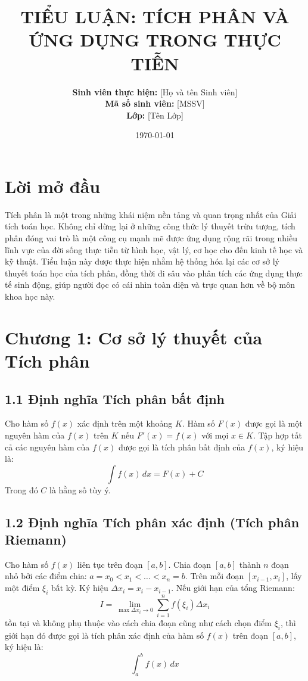 \documentclass[12pt,a4paper]{article}
\title{\textbf{TIỂU LUẬN: TÍCH PHÂN VÀ ỨNG DỤNG TRONG THỰC TIỄN}}
\author{\textbf{Sinh viên thực hiện:} [Họ và tên Sinh viên] \\ \textbf{Mã số sinh viên:} [MSSV] \\ \textbf{Lớp:} [Tên Lớp]}
\date{\today}
\begin{document}
\maketitle
\newpage

\tableofcontents
\newpage

\section*{Lời mở đầu}
Tích phân là một trong những khái niệm nền tảng và quan trọng nhất của Giải tích toán học. Không chỉ dừng lại ở những công thức lý thuyết trừu tượng, tích phân đóng vai trò là một công cụ mạnh mẽ được ứng dụng rộng rãi trong nhiều lĩnh vực của đời sống thực tiễn từ hình học, vật lý, cơ học cho đến kinh tế học và kỹ thuật. Tiểu luận này được thực hiện nhằm hệ thống hóa lại các cơ sở lý thuyết toán học của tích phân, đồng thời đi sâu vào phân tích các ứng dụng thực tế sinh động, giúp người đọc có cái nhìn toàn diện và trực quan hơn về bộ môn khoa học này.

\newpage

\section{Chương 1: Cơ sở lý thuyết của Tích phân}

\subsection{1.1 Định nghĩa Tích phân bất định}
Cho hàm số $f(x)$ xác định trên một khoảng $K$. Hàm số $F(x)$ được gọi là một nguyên hàm của $f(x)$ trên $K$ nếu $F'(x) = f(x)$ với mọi $x \in K$.
Tập hợp tất cả các nguyên hàm của $f(x)$ được gọi là tích phân bất định của $f(x)$, ký hiệu là:
\begin{equation}
\int f(x) \, dx = F(x) + C
\end{equation}
Trong đó $C$ là hằng số tùy ý.

\subsection{1.2 Định nghĩa Tích phân xác định (Tích phân Riemann)}
Cho hàm số $f(x)$ liên tục trên đoạn $[a, b]$. Chia đoạn $[a, b]$ thành $n$ đoạn nhỏ bởi các điểm chia: $a = x_0 < x_1 < \dots < x_n = b$. Trên mỗi đoạn $[x_{i-1}, x_i]$, lấy một điểm $\xi_i$ bất kỳ. Ký hiệu $\Delta x_i = x_i - x_{i-1}$. 
Nếu giới hạn của tổng Riemann:
\begin{equation}
I = \lim_{\max \Delta x_i \to 0} \sum_{i=1}^{n} f(\xi_i) \Delta x_i
\end{equation}
tồn tại và không phụ thuộc vào cách chia đoạn cũng như cách chọn điểm $\xi_i$, thì giới hạn đó được gọi là tích phân xác định của hàm số $f(x)$ trên đoạn $[a, b]$, ký hiệu là:
\begin{equation}
\int_{a}^{b} f(x) \, dx
\end{equation}
\end{document}
